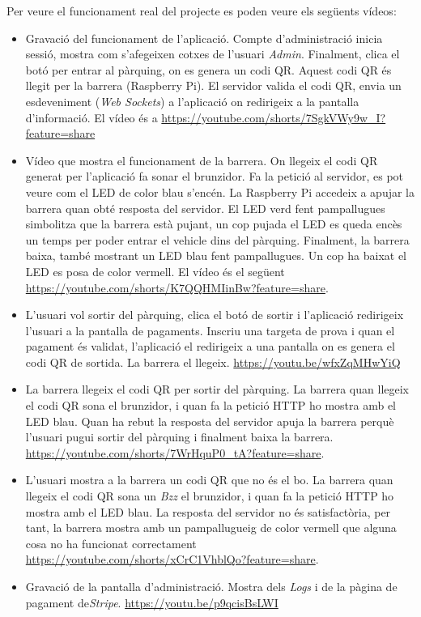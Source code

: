 Per veure el funcionament real del projecte es poden veure els següents vídeos:
\begin{itemize}
    \item Gravació del funcionament de l'aplicació. Compte d'administració inicia sessió,
    mostra com s'afegeixen cotxes de l'usuari \emph{Admin}. Finalment, clica el botó per entrar al
    pàrquing, on es genera un codi QR. Aquest codi QR és llegit per la barrera (Raspberry Pi).
    El servidor valida el codi QR, envia un esdeveniment (\emph{Web Sockets}) a l'aplicació on
    redirigeix a la pantalla d'informació.
    El vídeo és a \url{https://youtube.com/shorts/7SgkVWy9w_I?feature=share}
    \item Vídeo que mostra el funcionament de la barrera. On llegeix el codi QR generat per l'aplicació
    fa sonar el brunzidor. Fa la petició al servidor, es pot veure com el LED de color blau s'encén.
    La Raspberry Pi accedeix a apujar la barrera quan obté resposta del servidor. El LED verd fent pampallugues
    simbolitza que la barrera està pujant, un cop pujada el LED es queda encès un temps per poder entrar el
    vehicle dins del pàrquing. Finalment, la barrera baixa, també mostrant un LED blau fent pampallugues.
    Un cop ha baixat el LED es posa de color vermell.
    El vídeo és el següent \url{https://youtube.com/shorts/K7QQHMIinBw?feature=share}.
    \item L'usuari vol sortir del pàrquing, clica el botó de sortir i l'aplicació redirigeix l'usuari
    a la pantalla de pagaments. Inscriu una targeta de prova i quan el pagament és validat, l'aplicació el
    redirigeix a una pantalla on es genera el codi QR de sortida. La barrera el llegeix.
    \url{https://youtu.be/wfxZqMHwYiQ}
    \item La barrera llegeix el codi QR per sortir del pàrquing. La barrera quan llegeix el codi
    QR sona el brunzidor, i quan fa la petició HTTP ho mostra amb el LED blau. Quan ha rebut la resposta del servidor
    apuja la barrera perquè l'usuari pugui sortir del pàrquing i finalment baixa la barrera.
    \url{https://youtube.com/shorts/7WrHquP0_tA?feature=share}.
    \item L'usuari mostra a la barrera un codi QR que no és el bo. La barrera quan llegeix el codi
    QR sona un \emph{Bzz} el brunzidor, i quan fa la petició HTTP ho mostra amb el LED blau.
    La resposta del servidor no és satisfactòria, per tant, la barrera mostra amb un pampallugueig de color vermell que alguna
    cosa no ha funcionat correctament \url{https://youtube.com/shorts/xCrC1VhblQo?feature=share}.
    \item Gravació de la pantalla d'administració. Mostra dels \emph{Logs} i de la pàgina de pagament de\emph{Stripe}.
    \url{https://youtu.be/p9qcisBsLWI}
\end{itemize}
